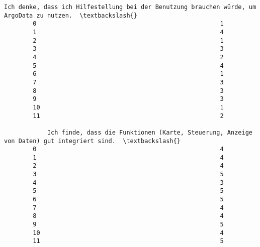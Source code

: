 \documentclass[11pt]{article}
\begin{document}
\begin{Verbatim}[commandchars=\\\{\}]
            Ich denke, dass ich Hilfestellung bei der Benutzung brauchen würde, um ArgoData zu nutzen.  \textbackslash{}
        0                                                   1                                            
        1                                                   4                                            
        2                                                   1                                            
        3                                                   3                                            
        4                                                   2                                            
        5                                                   4                                            
        6                                                   1                                            
        7                                                   3                                            
        8                                                   3                                            
        9                                                   3                                            
        10                                                  1                                            
        11                                                  2                                            
        
            Ich finde, dass die Funktionen (Karte, Steuerung, Anzeige von Daten) gut integriert sind.  \textbackslash{}
        0                                                   4                                           
        1                                                   4                                           
        2                                                   4                                           
        3                                                   5                                           
        4                                                   3                                           
        5                                                   5                                           
        6                                                   5                                           
        7                                                   4                                           
        8                                                   4                                           
        9                                                   5                                           
        10                                                  4                                           
        11                                                  5                                           
        

\end{Verbatim}
\end{document}
